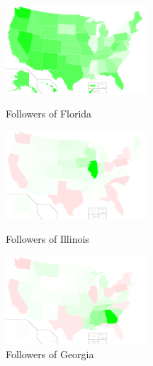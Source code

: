 \begin{figure}[t]
\begin{minipage}[b]{0.32\linewidth}
\centering
\includegraphics[width=53mm]{./images/fl.pdf}
\caption{Followers of Florida}
\label{fig:state-fl}
\end{minipage}
\hspace{2mm}
\begin{minipage}[b]{0.32\linewidth}
\centering
\includegraphics[width=53mm]{./images/il.pdf}
\caption{Followers of Illinois}
\label{fig:state-il}
\end{minipage}
\hspace{2mm}
\begin{minipage}[b]{0.32\linewidth}
\centering
\includegraphics[width=53mm]{./images/ga.pdf}
\caption{Followers of Georgia}
\label{fig:state-ga}
\end{minipage}
\end{figure}

